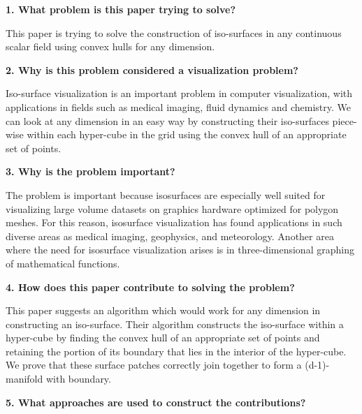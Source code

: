\documentclass{article}[12pt]
\begin{document}
\noindent
{\bf 1. What problem is this paper trying to solve?}

{
    This paper is trying to solve the construction of iso-surfaces in any continuous scalar field using convex hulls for any dimension.
}




\vspace{2ex}\noindent
{\bf 2. Why is this problem considered a visualization problem?}

{
   Iso-surface visualization is an important problem in computer visualization, with applications in fields such as medical imaging, fluid dynamics and chemistry. We can look at any dimension in an easy way by constructing their iso-surfaces piece-wise within each hyper-cube in the grid using the convex hull of an appropriate set of points. 
}




\vspace{2ex}\noindent
{\bf 3. Why is the problem important? }

{
    The problem is important because isosurfaces are especially well suited for visualizing large volume datasets on graphics hardware optimized for polygon meshes. For this reason, isosurface visualization has found applications in such diverse areas as medical imaging, geophysics, and meteorology. Another area where the need for isosurface visualization arises is in three-dimensional graphing of mathematical functions.
}




\vspace{2ex}\noindent
{ \bf 4. How does this paper contribute to solving the problem? }

{
    This paper suggests an algorithm which would work for any dimension in constructing an iso-surface. Their algorithm constructs the iso-surface within a hyper-cube by finding the convex hull of an appropriate set of points and retaining the portion of its boundary that lies in the interior of the hyper-cube. We prove that these surface patches correctly join together to form a (d-1)-manifold with boundary.
    
}


\vspace{2ex}\noindent
{\bf 5. What approaches are used to construct the contributions?}
\end{document}
